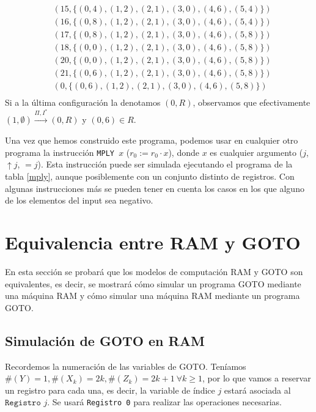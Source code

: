 \documentclass[twoside]{article}
\newcommand{\yields}{\overset{\Pi,I^*}{\rightarrow}}
\begin{document}
\begin{ej}
\begin{align*}
&(15,\{(0,4),(1,2),(2,1),(3,0),(4,6),(5,4)\})\\
&(16,\{(0,8),(1,2),(2,1),(3,0),(4,6),(5,4)\})\\
&(17,\{(0,8),(1,2),(2,1),(3,0),(4,6),(5,8)\})\\
&(18,\{(0,0),(1,2),(2,1),(3,0),(4,6),(5,8)\})\\
&(20,\{(0,0),(1,2),(2,1),(3,0),(4,6),(5,8)\})\\
&(21,\{(0,6),(1,2),(2,1),(3,0),(4,6),(5,8)\})\\
&(0,\{(0,6),(1,2),(2,1),(3,0),(4,6),(5,8)\})\\
\end{align*}
Si a la última configuración la denotamos $(0,R)$, observamos que efectivamente $(1,\emptyset)\yields (0,R)$ y $(0,6)\in R$. 
\end{ej}

\begin{nota}
Una vez que hemos construido este programa, podemos usar en cualquier otro programa la instrucción \texttt{MPLY }$x$ ($r_0:=r_0\cdot x$), donde $x$ es cualquier argumento ($j$, $\uparrow j$, $=j$). Esta instrucción puede ser simulada ejecutando el programa de la tabla \ref{mply}, aunque posiblemente con un conjunto distinto de registros. Con algunas instrucciones más se pueden tener en cuenta los casos en los que alguno de los elementos del input sea negativo. 
\end{nota}

\newpage

\section{Equivalencia entre RAM y GOTO}

En esta sección se probará que los modelos de computación RAM y GOTO son equivalentes, es decir, se mostrará cómo simular un programa GOTO mediante una máquina RAM  y cómo simular una máquina RAM mediante un programa GOTO. 

\subsection{Simulación de GOTO en RAM}
Recordemos la numeración de las variables de GOTO. Teníamos $\#(Y)=1,\#(X_k)=2k,\#(Z_k)=2k+1\ \forall k\geq 1$, por lo que vamos a reservar un registro para cada una, es decir, la variable de índice $j$ estará asociada al $\texttt{Registro } j$. Se usará \texttt{Registro 0} para realizar las operaciones necesarias.
\end{document}
